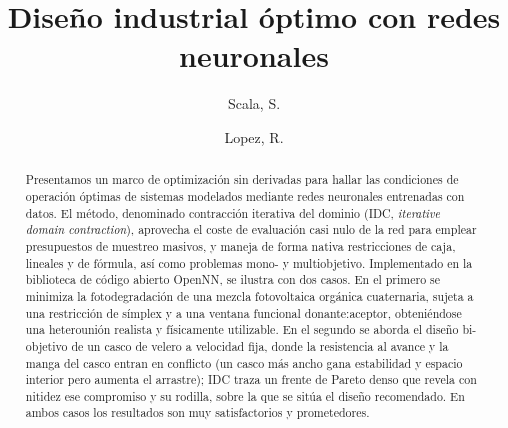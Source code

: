 \documentclass[5p,times,authoryear]{sciarticle}
\begin{document}
\begin{frontmatter}


\title{Diseño industrial óptimo con redes neuronales}

\author[A,B]{Scala, S.}
\author[A]{Lopez, R.}


\address[A]{Artelnics, C/ del Adaja 10, 37185 Villamayor, Salamanca, España.}
\address[B]{KU Leuven, Departamento de Ingeniería Química, Celestijnenlaan 200F, 3001 Lovaina, Bélgica.}

\begin{comocitar}
\begin{center}
\begin{tcolorbox}[frame hidden, width=\linewidth*2, colframe=white, colback=black!8!white]
\end{tcolorbox}
\end{center}
\end{comocitar}

\begin{abstract}
Presentamos un marco de optimización sin derivadas para hallar las
condiciones de operación óptimas de sistemas modelados mediante redes
neuronales entrenadas con datos. El método, denominado contracción
iterativa del dominio (IDC, \emph{iterative domain contraction}),
aprovecha el coste de evaluación casi nulo de la red para emplear
presupuestos de muestreo masivos, y maneja de forma nativa
restricciones de caja, lineales y de fórmula, así como problemas
mono- y multiobjetivo. Implementado en la biblioteca de código abierto
OpenNN, se ilustra con dos casos. En el primero se minimiza la
fotodegradación de una mezcla fotovoltaica orgánica cuaternaria, sujeta a
una restricción de símplex y a una ventana funcional donante:aceptor,
obteniéndose una heterounión realista y físicamente utilizable. En el
segundo se aborda el diseño bi-objetivo de un casco de velero a velocidad
fija, donde la resistencia al avance y la manga del casco entran en
conflicto (un casco más ancho gana estabilidad y espacio interior pero
aumenta el arrastre); IDC traza un frente de Pareto denso que revela con
nitidez ese compromiso y su rodilla, sobre la que se sitúa el diseño
recomendado. En ambos casos los resultados son muy satisfactorios y
prometedores.
\end{abstract}


\end{frontmatter}
\end{document}
